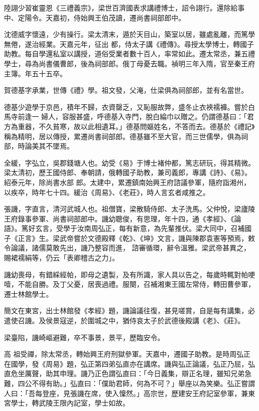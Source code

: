 \begin{pinyinscope}
 陸詡少習崔靈恩《三禮義宗》，梁世百濟國表求講禮博士，詔令詡行。還除給事中、定陽令。天嘉初，侍始興王伯茂讀，遷尚書祠部郎中。



 沈德威字懷遠，少有操行。梁太清末，遁於天目山，築室以居，雖處亂離，而篤學無倦，遂治經業。天嘉元年，征出
 都，侍太子講《禮傳》。尋授太學博士，轉國子助教。每自學還私室以講授，道俗受業者數十百人，率常如此。遷太常丞，兼五禮學士，尋為尚書儀曹郎，後為祠部郎。俄丁母憂去職。禎明三年入隋，官至秦王府主簿。年五十五卒。



 賀德基字承業，世傳《禮》學。祖文發，父淹，仕梁俱為祠部郎，並有名當世。



 德基少遊學于京邑，積年不歸，衣資罄乏，又恥服故弊，盛冬止衣裌襦褲。嘗於白馬寺前逢一
 婦人，容服甚盛，呼德基入寺門，脫白綸巾以贈之。仍謂德基曰：「君方為重器，不久貧寒，故以此相遺耳。」德基問嫗姓名，不答而去。德基於《禮記》稱為精明，居以傳授，累遷尚書祠部郎。德基雖不至大官，而三世儒學，俱為祠部，時論美其不墜焉。



 全緩，字弘立，吳郡錢塘人也。幼受《易》于博士褚仲都，篤志研玩，得其精微。梁太清初，歷王國侍郎、奉朝請，俄轉國子助教，兼司義郎，專講《詩》、《易》。紹泰元年，除尚書水部
 郎。太建中，累遷鎮南始興王府諮議參軍，隨府詣湘州，以疾卒，時年七十四。緩治《周易》、《老莊》，時人言玄者咸推之。



 張譏，字直言，清河武城人也。祖僧寶，梁散騎侍郎、太子洗馬。父仲悅，梁廬陵王府錄事參軍、尚書祠部郎中。譏幼聰俊，有思理，年十四，通《孝經》、《論語》。篤好玄言，受學于汝南周弘正，每有新意，為先輩推伏。梁大同中，召補國子《正言》生。梁武帝嘗於文德殿釋《乾》、《坤》文言，譏與陳郡袁憲等預焉，敕令論議，諸儒莫敢先出，譏乃整容而進，
 諮審循環，辭令溫雅。梁武帝甚異之，賜裙襦絹等，仍云「表卿稽古之力」。



 譏幼喪母，有錯綵經帕，即母之遺製，及有所識，家人具以告之，每歲時輒對帕哽噎，不能自勝。及丁父憂，居喪過禮。服闋，召補湘東王國左常侍，轉田曹參軍，遷士林館學士。



 簡文在東宮，出士林館發《孝經》題，譏論議往復，甚見嗟賞，自是每有講集，必遣使召譏。及侯景寇逆，於圍城之中，猶侍哀太子於武德後殿講《老》、《莊》。



 梁臺陷，譏崎嶇避難，卒不事景，景平，歷臨安令。



 高
 祖受禪，除太常丞，轉始興王府刑獄參軍。天嘉中，遷國子助教。是時周弘正在國學，發《周易》題，弘正第四弟弘直亦在講席。譏與弘正論議，弘正乃屈，弘直危坐厲聲，助其申理。譏乃正色謂弘直曰：「今日義集，辯正名理，雖知兄弟急難，四公不得有助。」弘直曰：「僕助君師，何為不可？」舉座以為笑樂。弘正嘗謂人曰：「吾每登座，見張譏在席，使入懍然。」高宗世，歷建安王府記室參軍，兼東宮學士，轉武陵王限內記室，學士如故。




\end{pinyinscope}
